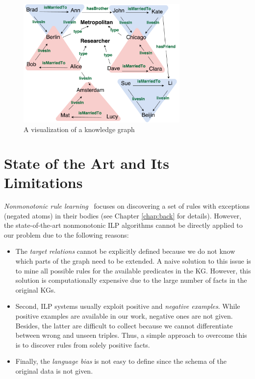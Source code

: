 \begin{figure}[t]
\centering
\includegraphics[width=0.75\textwidth]{figures/kg_advanced_col}
\caption{A visualization of a knowledge graph}
\label{fig1.1}
\end{figure}

\section{State of the Art and Its Limitations}

\textit{Nonmonotonic rule learning}~\cite{ref11, ref40, ref41, ref32, ref42} focuses on discovering a set of rules with exceptions (negated atoms) in their bodies (see Chapter \ref{chap:back} for details). However, the state-of-the-art nonmonotonic ILP algorithms cannot be directly applied to our problem due to the following reasons:
\begin{itemize}
\item The \textit{target relations} cannot be explicitly defined because we do not know which parts of the graph need to be extended. A naive solution to this issue is to mine all possible rules for the available predicates in the KG. However, this solution is computationally expensive due to the large number of facts in the original KGs.
\item Second, ILP systems usually exploit positive and \textit{negative examples}. While positive examples are available in our work, negative ones are not given. Besides, the latter are difficult to collect because we cannot differentiate between wrong and unseen triples. Thus, a simple approach to overcome this is to discover rules from solely positive facts.
\item Finally, the \textit{language bias} is not easy to define since the schema of the original data is not given.
\end{itemize}

